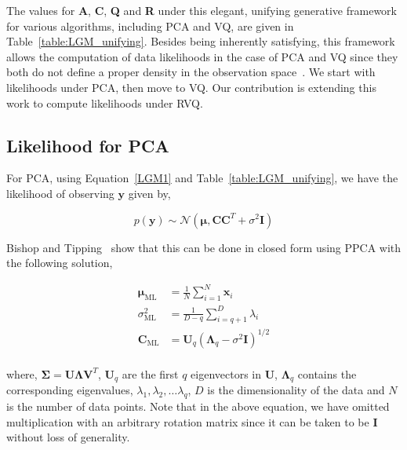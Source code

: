 The values for \textbf{A}, \textbf{C}, \textbf{Q} and \textbf{R} under this elegant, unifying generative framework for various algorithms, including PCA and VQ, are given in Table~\ref{table:LGM_unifying}.  Besides being inherently satisfying, this framework allows the computation of data likelihoods in the case of PCA and VQ since they both do not define a proper density in the observation space~\cite{1999_JNL_Gaussian_roweis}.  We start with likelihoods under PCA, then move to VQ.  Our contribution is extending this work to compute likelihoods under RVQ.


\subsection{Likelihood for PCA}
For PCA, using Equation~\ref{LGM1} and Table~\ref{table:LGM_unifying}, we have the likelihood of observing $\mathbf{y}$ given by,

\begin{equation}
p(\mathbf{y}) \sim \mathcal{N}(\boldsymbol\mu, \mathbf{C}\mathbf{C}^T + \sigma^2 \mathbf{I})
\end{equation}

Bishop and Tipping~\cite{1999_JNL_PPCA_Tipping} show that this can be done in closed form using PPCA with the following solution,

\begin{equation}
\begin{array}{lllll}
\mathbf{\boldsymbol\mu}_{\textrm{ML}} &=\frac{1}{N}\sum\limits_{i=1}^N \mathbf{x}_i\\
\sigma^2_{\textrm{ML}} &= \frac{1}{D-q}\sum\limits_{i=q+1}^D \lambda_i\\
\mathbf{C}_{\textrm{ML}} &= \mathbf{U}_q(\mathbf{\Lambda}_q - \sigma^2\mathbf{I})^{1/2} \\
\end{array}
\label{Eqn:PPCA}
\end{equation}

where, $\boldsymbol\Sigma = \mathbf{U}\mathbf{\Lambda}\mathbf{V}^T$, $\mathbf{U}_q$ are the first $q$ eigenvectors in $\mathbf{U}$, $\mathbf{\Lambda}_q$ contains the corresponding eigenvalues, $\lambda_1, \lambda_2, \ldots \lambda_q$, $D$ is the dimensionality of the data and $N$ is the number of data points.  Note that in the above equation, we have omitted multiplication with an arbitrary rotation matrix since it can be taken to be $\mathbf{I}$ without loss of generality.  

